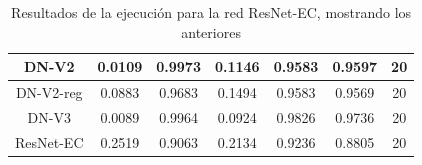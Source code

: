\documentclass[11pt,a4paper]{article}
\theoremstyle{definition}
\begin{document}
\begin{table}[H]
\begin{tabular}{|c|c|c|c|c|c|c|}
\hline
DN-V2                                               & \textcolor[rgb]{0.129,0.129,0.129}{0.0109 } & \textcolor[rgb]{0.129,0.129,0.129}{0.9973 } & \textcolor[rgb]{0.129,0.129,0.129}{0.1146 }                                                                       & \textcolor[rgb]{0.129,0.129,0.129}{0.9583}                                                                             & \textcolor[rgb]{0.129,0.129,0.129}{0.9597}                                                                       & 20                                                                                                              \\
\hline
DN-V2-reg                                           & \textcolor[rgb]{0.129,0.129,0.129}{0.0883 } & \textcolor[rgb]{0.129,0.129,0.129}{0.9683 } & \textcolor[rgb]{0.129,0.129,0.129}{0.1494 }                                                                       & \textcolor[rgb]{0.129,0.129,0.129}{0.9583}                                                                             & \textcolor[rgb]{0.129,0.129,0.129}{0.9569}                                                                       & 20                                                                                                              \\
\hline
DN-V3                                               & \textcolor[rgb]{0.129,0.129,0.129}{0.0089 } & \textcolor[rgb]{0.129,0.129,0.129}{0.9964 } & \textcolor[rgb]{0.129,0.129,0.129}{0.0924 }                                                                       & \textcolor[rgb]{0.129,0.129,0.129}{0.9826}                                                                             & \textcolor[rgb]{0.129,0.129,0.129}{0.9736}                                                                       & 20                                                                                                              \\
\hline
\rowcolor{green} ResNet-EC                                              & \textcolor[rgb]{0.129,0.129,0.129}{0.2519 } & \textcolor[rgb]{0.129,0.129,0.129}{0.9063 } & \textcolor[rgb]{0.129,0.129,0.129}{0.2134 }                                                                       & \textcolor[rgb]{0.129,0.129,0.129}{0.9236}                                                                             & \textcolor[rgb]{0.129,0.129,0.129}{0.8805}                                                                       & 20                                                                                                              \\
\hline


\end{tabular}
\caption{Resultados de la ejecución para la red ResNet-EC, mostrando los anteriores}
\end{table}
\end{document}
